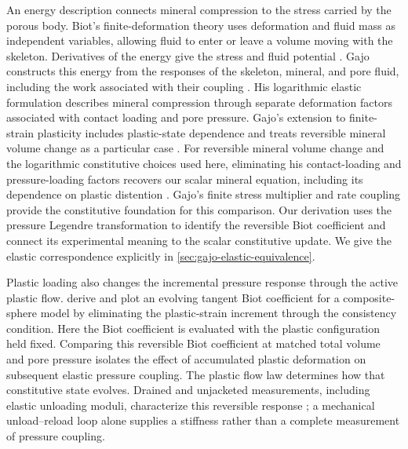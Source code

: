 An energy description connects mineral compression to the stress carried
by the porous body.  Biot's finite-deformation theory uses deformation and
fluid mass as independent variables, allowing fluid to enter or leave a
volume moving with the skeleton.  Derivatives of the energy give the stress
and fluid potential \citep{biot1972}.  Gajo constructs this energy from the
responses of the skeleton, mineral, and pore fluid, including the work
associated with their coupling \citep{gajo2010}.  His logarithmic elastic
formulation describes mineral compression through separate deformation
factors associated with contact loading and pore pressure.  Gajo's
extension to finite-strain plasticity includes plastic-state dependence
and treats reversible mineral volume change as a particular case
\citep{gajo2011}.  For reversible mineral volume change and the logarithmic
constitutive choices used here, eliminating his contact-loading and
pressure-loading factors recovers our
scalar mineral equation, including its dependence on plastic distention
\citep[Eqs.~(35)--(39), (47), and Appendix~C.1]{gajo2011}.
Gajo's finite stress multiplier and rate coupling provide the constitutive
foundation for this comparison.  Our derivation uses the pressure Legendre
transformation to identify the reversible Biot coefficient and connect its
experimental meaning to the scalar constitutive update.  We give the elastic
correspondence explicitly in \cref{sec:gajo-elastic-equivalence}.

Plastic loading also changes the incremental pressure response through
the active plastic flow.  \citet{suvorovselvadurai2019} derive and plot an
evolving tangent Biot coefficient for a composite-sphere model by
eliminating the plastic-strain increment through the consistency condition.
Here the Biot coefficient is evaluated with the plastic configuration
held fixed.  Comparing this reversible Biot coefficient at matched total volume
and pore pressure isolates the effect of accumulated plastic deformation
on subsequent elastic pressure coupling.  The plastic flow law determines how that
constitutive state evolves.  Drained and unjacketed measurements, including
elastic unloading moduli, characterize this reversible response
\citep{makhnenkolabuz2016}; a mechanical unload--reload loop alone supplies
a stiffness rather than a complete measurement of pressure coupling.

